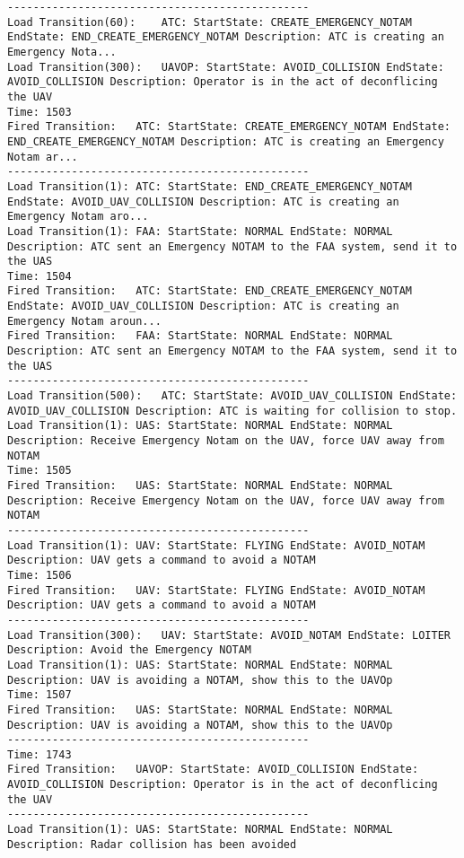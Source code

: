 \begin{spacing}{1}
\begin{verbatim}
-----------------------------------------------
Load Transition(60):	ATC: StartState: CREATE_EMERGENCY_NOTAM EndState: END_CREATE_EMERGENCY_NOTAM Description: ATC is creating an Emergency Nota...
Load Transition(300):	UAVOP: StartState: AVOID_COLLISION EndState: AVOID_COLLISION Description: Operator is in the act of deconflicing the UAV
Time: 1503
Fired Transition:	ATC: StartState: CREATE_EMERGENCY_NOTAM EndState: END_CREATE_EMERGENCY_NOTAM Description: ATC is creating an Emergency Notam ar...
-----------------------------------------------
Load Transition(1):	ATC: StartState: END_CREATE_EMERGENCY_NOTAM EndState: AVOID_UAV_COLLISION Description: ATC is creating an Emergency Notam aro...
Load Transition(1):	FAA: StartState: NORMAL EndState: NORMAL Description: ATC sent an Emergency NOTAM to the FAA system, send it to the UAS
Time: 1504
Fired Transition:	ATC: StartState: END_CREATE_EMERGENCY_NOTAM EndState: AVOID_UAV_COLLISION Description: ATC is creating an Emergency Notam aroun...
Fired Transition:	FAA: StartState: NORMAL EndState: NORMAL Description: ATC sent an Emergency NOTAM to the FAA system, send it to the UAS
-----------------------------------------------
Load Transition(500):	ATC: StartState: AVOID_UAV_COLLISION EndState: AVOID_UAV_COLLISION Description: ATC is waiting for collision to stop.
Load Transition(1):	UAS: StartState: NORMAL EndState: NORMAL Description: Receive Emergency Notam on the UAV, force UAV away from NOTAM
Time: 1505
Fired Transition:	UAS: StartState: NORMAL EndState: NORMAL Description: Receive Emergency Notam on the UAV, force UAV away from NOTAM
-----------------------------------------------
Load Transition(1):	UAV: StartState: FLYING EndState: AVOID_NOTAM Description: UAV gets a command to avoid a NOTAM
Time: 1506
Fired Transition:	UAV: StartState: FLYING EndState: AVOID_NOTAM Description: UAV gets a command to avoid a NOTAM
-----------------------------------------------
Load Transition(300):	UAV: StartState: AVOID_NOTAM EndState: LOITER Description: Avoid the Emergency NOTAM
Load Transition(1):	UAS: StartState: NORMAL EndState: NORMAL Description: UAV is avoiding a NOTAM, show this to the UAVOp
Time: 1507
Fired Transition:	UAS: StartState: NORMAL EndState: NORMAL Description: UAV is avoiding a NOTAM, show this to the UAVOp
-----------------------------------------------
Time: 1743
Fired Transition:	UAVOP: StartState: AVOID_COLLISION EndState: AVOID_COLLISION Description: Operator is in the act of deconflicing the UAV
-----------------------------------------------
Load Transition(1):	UAS: StartState: NORMAL EndState: NORMAL Description: Radar collision has been avoided

\end{verbatim}
\end{spacing}
